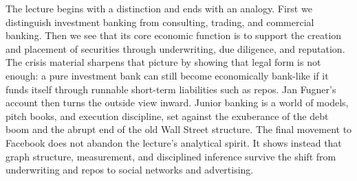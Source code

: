 The lecture begins with a distinction and ends with an analogy. First we distinguish investment banking from consulting, trading, and commercial banking. Then we see that its core economic function is to support the creation and placement of securities through underwriting, due diligence, and reputation. The crisis material sharpens that picture by showing that legal form is not enough: a pure investment bank can still become economically bank-like if it funds itself through runnable short-term liabilities such as repos. Jan Fugner's account then turns the outside view inward. Junior banking is a world of models, pitch books, and execution discipline, set against the exuberance of the debt boom and the abrupt end of the old Wall Street structure. The final movement to Facebook does not abandon the lecture's analytical spirit. It shows instead that graph structure, measurement, and disciplined inference survive the shift from underwriting and repos to social networks and advertising.